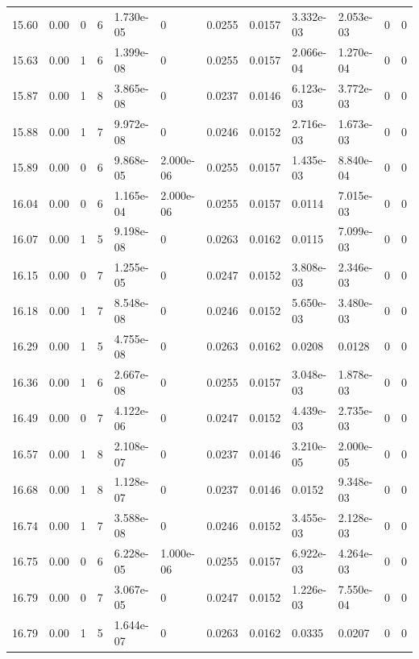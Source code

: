 \documentclass[preview]{standalone}
\begin{document}
{{{{{{\begin{tabular}{L{1.2cm}C{1.2cm} C{0.3cm}C{0.5cm} C{1.4cm}C{1.4cm} C{1.4cm}C{1.4cm} C{1.6cm}C{1.6cm} C{1.6cm}C{1.6cm}}
  15.60  &  0.00  & 0     &  6 &  1.730e-05  & 0  &  0.0255&   0.0157& 3.332e-03 & 2.053e-03   &  0 & 0  \\ 
  15.63  &  0.00  & 1     &  6 &  1.399e-08  & 0  &  0.0255&   0.0157& 2.066e-04 & 1.270e-04   &  0 & 0  \\ 
  15.87  &  0.00  & 1     &  8 &  3.865e-08  & 0  &  0.0237&   0.0146& 6.123e-03 & 3.772e-03   &  0 & 0  \\ 
  15.88  &  0.00  & 1     &  7 &  9.972e-08  & 0  &  0.0246&   0.0152& 2.716e-03 & 1.673e-03   &  0 & 0  \\ 
  15.89  &  0.00  & 0     &  6 &  9.868e-05  & 2.000e-06  &  0.0255&   0.0157& 1.435e-03 & 8.840e-04   &  0 & 0  \\ 
  16.04  &  0.00  & 0     &  6 &  1.165e-04  & 2.000e-06  &  0.0255&   0.0157& 0.0114 & 7.015e-03   &  0 & 0  \\ 
  16.07  &  0.00  & 1     &  5 &  9.198e-08  & 0  &  0.0263&   0.0162& 0.0115 & 7.099e-03   &  0 & 0  \\ 
  16.15  &  0.00  & 0     &  7 &  1.255e-05  & 0  &  0.0247&   0.0152& 3.808e-03 & 2.346e-03   &  0 & 0  \\ 
  16.18  &  0.00  & 1     &  7 &  8.548e-08  & 0  &  0.0246&   0.0152& 5.650e-03 & 3.480e-03   &  0 & 0  \\ 
  16.29  &  0.00  & 1     &  5 &  4.755e-08  & 0  &  0.0263&   0.0162& 0.0208 & 0.0128   &  0 & 0  \\ 
  16.36  &  0.00  & 1     &  6 &  2.667e-08  & 0  &  0.0255&   0.0157& 3.048e-03 & 1.878e-03   &  0 & 0  \\ 
  16.49  &  0.00  & 0     &  7 &  4.122e-06  & 0  &  0.0247&   0.0152& 4.439e-03 & 2.735e-03   &  0 & 0  \\ 
  16.57  &  0.00  & 1     &  8 &  2.108e-07  & 0  &  0.0237&   0.0146& 3.210e-05 & 2.000e-05   &  0 & 0  \\ 
  16.68  &  0.00  & 1     &  8 &  1.128e-07  & 0  &  0.0237&   0.0146& 0.0152 & 9.348e-03   &  0 & 0  \\ 
  16.74  &  0.00  & 1     &  7 &  3.588e-08  & 0  &  0.0246&   0.0152& 3.455e-03 & 2.128e-03   &  0 & 0  \\ 
  16.75  &  0.00  & 0     &  6 &  6.228e-05  & 1.000e-06  &  0.0255&   0.0157& 6.922e-03 & 4.264e-03   &  0 & 0  \\ 
  16.79  &  0.00  & 0     &  7 &  3.067e-05  & 0  &  0.0247&   0.0152& 1.226e-03 & 7.550e-04   &  0 & 0  \\ 
  16.79  &  0.00  & 1     &  5 &  1.644e-07  & 0  &  0.0263&   0.0162& 0.0335 & 0.0207   &  0 & 0  \\ 

\end{tabular}}}}}}}
\end{document}
